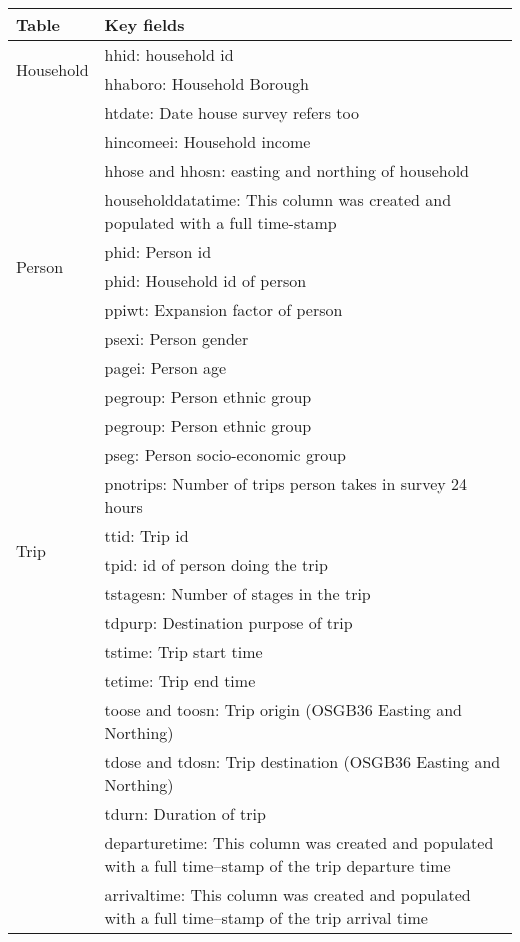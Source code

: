\begin{center}
\begin{table}[h!]
    \begin{tabular}{ | p{2.2cm} | p{12cm} |}
    \hline
    \textbf{Table} & \textbf{Key fields} \\ \hline
    \multirow{2}{*}{Household} & hhid: household id \\
     & hhaboro: Household Borough \\
     & htdate: Date house survey refers too \\
     & hincomeei: Household income \\
     & hhose and hhosn: easting and northing of household \\ 
     & householddatatime: This column was created and populated with a full time-stamp \\ \hline
   \multirow{2}{*}{Person} & phid: Person id \\
     & phid: Household id of person \\
     & ppiwt: Expansion factor of person \\
     & psexi: Person gender \\
     & pagei: Person age \\
     & pegroup: Person ethnic group \\
     & pegroup: Person ethnic group \\
     & pseg: Person socio-economic group \\
     & pnotrips: Number of trips person takes in survey 24 hours \\ \hline
     \multirow{2}{*}{Trip} & ttid: Trip id \\
     & tpid: id of person doing the trip \\
     & tstagesn: Number of stages in the trip  \\
     & tdpurp: Destination purpose of trip \\
     & tstime: Trip start time \\
     & tetime: Trip end time \\
     & toose and toosn: Trip origin (OSGB36 Easting and Northing) \\
     & tdose and tdosn: Trip destination (OSGB36 Easting and Northing) \\
     & tdurn: Duration of trip \\ 
     & departuretime: This column was created and populated with a full time--stamp of the trip departure time \\
     & arrivaltime: This column was created and populated with a full time--stamp of the trip arrival time \\ \hline

\end{tabular}
\end{table}
\end{center}
